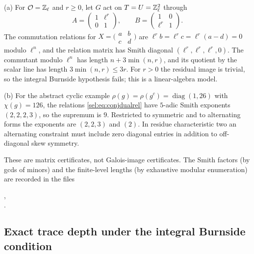 \begin{example}\label{sel:ex:smith}
(a) For $\mathcal{O}=\mathbb{Z}_\ell$ and $r\ge0$, let $G$ act on $T=U=\mathbb{Z}_\ell^2$ through
\[
 A=\begin{pmatrix}1&\ell^r\\0&1\end{pmatrix},\qquad
 B=\begin{pmatrix}1&0\\\ell^r&1\end{pmatrix}.
\]
The commutation relations for
$X=\bigl(\begin{smallmatrix}a&b\\c&d\end{smallmatrix}\bigr)$ are
$\ell^rb=\ell^rc=\ell^r(a-d)=0$ modulo $\ell^n$, and the relation matrix has
Smith diagonal $(\ell^r,\ell^r,\ell^r,0)$. The commutant modulo $\ell^n$ has
length $n+3\min(n,r)$, and its quotient by the scalar line has length
$3\min(n,r)\le3r$. For $r>0$ the residual image is trivial, so the integral
Burnside hypothesis fails; this is a linear-algebra model.

(b) For the abstract cyclic example $\rho(g)=\rho(g^c)=\operatorname{diag}(1,26)$
with $\chi(g)=126$, the relations \eqref{sel:eq:conjdualrel} have $5$-adic
Smith exponents $(2,2,2,3)$, so the supremum is $9$. Restricted to symmetric
and to alternating forms the exponents are $(2,2,3)$ and $(2)$. In residue
characteristic two an alternating constraint must include zero diagonal
entries in addition to off-diagonal skew symmetry.

These are matrix certificates, not Galois-image certificates. The Smith
factors (by gcds of minors) and the finite-level lengths (by exhaustive
modular enumeration) are recorded in the files
\begin{center}
\footnotesize
{},\\
.
\end{center}
\end{example}

\subsection{Exact trace depth under the integral Burnside condition}\label{sel:sec:tracedepth}

